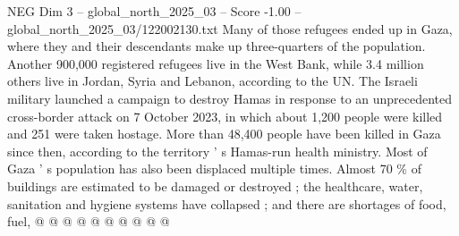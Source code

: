 \begin{textsample}{NEG Dim 3 – global\_north\_2025\_03 – Score -1.00 – global\_north\_2025\_03/122002130.txt}
Many of those refugees ended up in Gaza, where they and their descendants make up three-quarters of the population.
Another 900,000 registered refugees live in the West Bank, while 3.4 million others live in Jordan, Syria and Lebanon, according to the UN.
The Israeli military launched a campaign to destroy Hamas in response to an unprecedented cross-border attack on 7 October 2023, in which about 1,200 people were killed and 251 were taken hostage.
More than 48,400 people have been killed in Gaza since then, according to the territory ' s Hamas-run health ministry.
Most of Gaza ' s population has also been displaced multiple times.
Almost 70 \% of buildings are estimated to be damaged or destroyed ; the healthcare, water, sanitation and hygiene systems have collapsed ; and there are shortages of food, fuel, @ @ @ @ @ @ @ @ @ @

\end{textsample}

